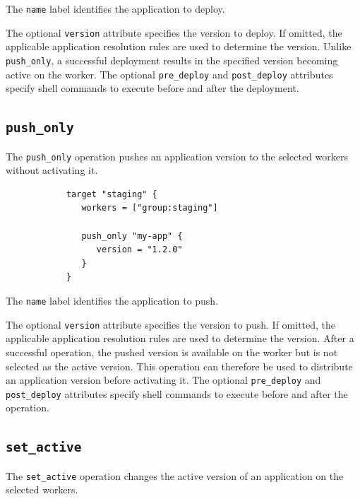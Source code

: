 \documentclass[11pt,a4paper]{article}
\begin{document}
    The \texttt{name} label identifies the application to deploy.

    The optional \texttt{version} attribute specifies the version to deploy.
    If omitted, the applicable application resolution rules are used to determine the version.
    Unlike \texttt{push\_only}, a successful deployment results in the specified version becoming active on the worker.
    The optional \texttt{pre\_deploy} and \texttt{post\_deploy} attributes specify shell commands to execute before and after the deployment.

    \subsection{\texttt{push\_only}}\label{subsec:texttt_target_push}

    The \texttt{push\_only} operation pushes an application version to the selected workers without activating it.

    \begin{center}
        \begin{verbatim}
            target "staging" {
               workers = ["group:staging"]

               push_only "my-app" {
                  version = "1.2.0"
               }
            }
        \end{verbatim}
    \end{center}

    The \texttt{name} label identifies the application to push.

    The optional \texttt{version} attribute specifies the version to push.
    If omitted, the applicable application resolution rules are used to determine the version.
    After a successful operation, the pushed version is available on the worker but is not selected as the active version.
    This operation can therefore be used to distribute an application version before activating it.
    The optional \texttt{pre\_deploy} and \texttt{post\_deploy} attributes specify shell commands to execute before and after the operation.

    \subsection{\texttt{set\_active}}\label{subsec:texttt:set_active}

    The \texttt{set\_active} operation changes the active version of an application on the selected workers.
\end{document}
